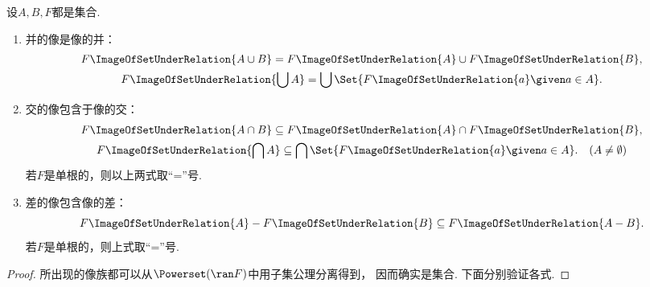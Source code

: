 \begin{theorem}
    设\(A,B,F\)都是集合.
    \begin{enumerate}
        \item 并的像是像的并：
        \begin{gather}
            F\ImageOfSetUnderRelation{A \cup B}
            = F\ImageOfSetUnderRelation{A} \cup F\ImageOfSetUnderRelation{B},
            \label{equation:集合论.并的像与像的并的关系1} \\
            F\ImageOfSetUnderRelation{\bigcup A}
            = \bigcup\Set{ F\ImageOfSetUnderRelation{a} \given a \in A }.
            \label{equation:集合论.并的像与像的并的关系2}
        \end{gather}

        \item 交的像包含于像的交：
        \begin{gather}
            F\ImageOfSetUnderRelation{A \cap B}
            \subseteq F\ImageOfSetUnderRelation{A} \cap F\ImageOfSetUnderRelation{B},
            \label{equation:集合论.交的像与像的交的关系1} \\
            F\ImageOfSetUnderRelation{\bigcap A}
            \subseteq \bigcap\Set{ F\ImageOfSetUnderRelation{a} \given a \in A }.
            \label{equation:集合论.交的像与像的交的关系2}
            \quad(A \neq \emptyset)
        \end{gather}
        若\(F\)是单根的，则以上两式取“=”号.

        \item 差的像包含像的差：
        \begin{equation}
            F\ImageOfSetUnderRelation{A} - F\ImageOfSetUnderRelation{B}
            \subseteq F\ImageOfSetUnderRelation{A-B}.
            \label{equation:集合论.差的像与像的差的关系}
        \end{equation}
        若\(F\)是单根的，则上式取“=”号.
    \end{enumerate}
    \begin{proof}
        所出现的像族都可以从\(\Powerset(\ran F)\)中用子集公理分离得到，
        因而确实是集合.
        下面分别验证各式.


\end{proof}
\end{theorem}
